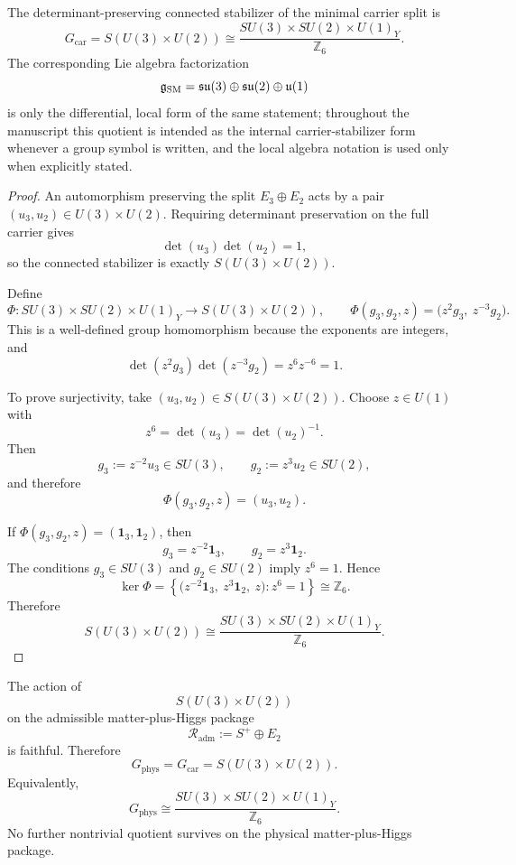\begin{theorem}
\label{thm:global-sm-theorem}
The determinant-preserving connected stabilizer of the minimal carrier split is
\[
G_{\mathrm{car}}
=
S(U(3)\times U(2))
\cong
\frac{SU(3)\times SU(2)\times U(1)_Y}{\mathbb Z_6}.
\]
The corresponding Lie algebra factorization
\[
\mathfrak g_{\mathrm{SM}}=\mathfrak{su}(3)\oplus\mathfrak{su}(2)\oplus\mathfrak u(1)
\]
is only the differential, local form of the same statement; throughout the manuscript this quotient
is intended as the internal carrier-stabilizer form whenever a group symbol is written, and the
local algebra notation is used only when explicitly stated.
\end{theorem}

\begin{proof}
An automorphism preserving the split $E_3\oplus E_2$ acts by a pair
$(u_3,u_2)\in U(3)\times U(2)$. Requiring determinant preservation on the full
carrier gives
\[
\det(u_3)\det(u_2)=1,
\]
so the connected stabilizer is exactly $S(U(3)\times U(2))$.

Define
\[
\Phi:SU(3)\times SU(2)\times U(1)_Y \longrightarrow S(U(3)\times U(2)),
\qquad
\Phi(g_3,g_2,z)=\bigl(z^2 g_3,\ z^{-3} g_2\bigr).
\]
This is a well-defined group homomorphism because the exponents are integers, and
\[
\det(z^2 g_3)\det(z^{-3} g_2)=z^6 z^{-6}=1.
\]

To prove surjectivity, take $(u_3,u_2)\in S(U(3)\times U(2))$. Choose
$z\in U(1)$ with
\[
z^6=\det(u_3)=\det(u_2)^{-1}.
\]
Then
\[
g_3:=z^{-2}u_3\in SU(3),
\qquad
g_2:=z^{3}u_2\in SU(2),
\]
and therefore
\[
\Phi(g_3,g_2,z)=(u_3,u_2).
\]

If $\Phi(g_3,g_2,z)=(\mathbf 1_3,\mathbf 1_2)$, then
\[
g_3=z^{-2}\mathbf 1_3,
\qquad
g_2=z^{3}\mathbf 1_2.
\]
The conditions $g_3\in SU(3)$ and $g_2\in SU(2)$ imply $z^6=1$. Hence
\[
\ker\Phi
=
\left\{
\bigl(z^{-2}\mathbf 1_3,\ z^{3}\mathbf 1_2,\ z\bigr): z^6=1
\right\}
\cong \mathbb Z_6.
\]
Therefore
\[
S(U(3)\times U(2))
\cong
\frac{SU(3)\times SU(2)\times U(1)_Y}{\mathbb Z_6}.
\]
\end{proof}

\begin{theorem}
\label{thm:physical-gauge-group}
\label{thm:physical-gauge-group-faithful}
The action of
\[
S(U(3)\times U(2))
\]
on the admissible matter-plus-Higgs package
\[
\mathcal R_{\mathrm{adm}}:=S^+\oplus E_2
\]
is faithful. Therefore
\[
G_{\mathrm{phys}}=G_{\mathrm{car}}=S(U(3)\times U(2)).
\]
Equivalently,
\[
G_{\mathrm{phys}}
\cong
\frac{SU(3)\times SU(2)\times U(1)_Y}{\mathbb Z_6}.
\]
No further nontrivial quotient survives on the physical matter-plus-Higgs package.
\end{theorem}

